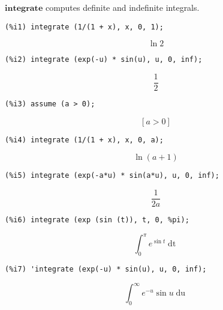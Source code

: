 \documentclass[12pt,leqno]{article}
\begin{document}
$\mathbf{integrate}$ computes definite and indefinite integrals.
\begin{verbatim}
(%i1) integrate (1/(1 + x), x, 0, 1);
\end{verbatim}
\begin{dmath}[number={\(\mathop{\mathrm{\%o}_{1}}\)}]
\ln 2
\end{dmath}
\begin{verbatim}
(%i2) integrate (exp(-u) * sin(u), u, 0, inf);
\end{verbatim}
\begin{dmath}[number={\(\mathop{\mathrm{\%o}_{2}}\)}]
\frac{1}{2}
\end{dmath}
\begin{verbatim}
(%i3) assume (a > 0);
\end{verbatim}
\begin{dmath}[number={\(\mathop{\mathrm{\%o}_{3}}\)}]
\left[a > 0\right]
\end{dmath}
\begin{verbatim}
(%i4) integrate (1/(1 + x), x, 0, a);
\end{verbatim}
\begin{dmath}[number={\(\mathop{\mathrm{\%o}_{4}}\)}]
\ln \left(a+1\right)
\end{dmath}
\begin{verbatim}
(%i5) integrate (exp(-a*u) * sin(a*u), u, 0, inf);
\end{verbatim}
\begin{dmath}[number={\(\mathop{\mathrm{\%o}_{5}}\)}]
\frac{1}{2 a}
\end{dmath}
\begin{verbatim}
(%i6) integrate (exp (sin (t)), t, 0, %pi);
\end{verbatim}
\begin{dmath}[number={\(\mathop{\mathrm{\%o}_{6}}\)}]
\int_{0}^{\pi}{e}^{\sin t}\mathop{dt}
\end{dmath}
\begin{verbatim}
(%i7) 'integrate (exp(-u) * sin(u), u, 0, inf);
\end{verbatim}
\begin{dmath}[number={\(\mathop{\mathrm{\%o}_{7}}\)}]
\int_{0}^{\infty}{e}^{-u} \sin u\mathop{du}
\end{dmath}
\end{document}
